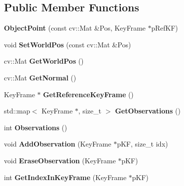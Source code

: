 \subsection*{Public Member Functions}
\begin{DoxyCompactItemize}
\item 
\mbox{\label{classObjectPoint_abe20569ffec71bce3c7798dd20098eff}} 
{\bfseries Object\+Point} (const cv\+::\+Mat \&Pos, Key\+Frame $\ast$p\+Ref\+KF)
\item 
\mbox{\label{classObjectPoint_a9202ad0239743be43bbae9af182fed56}} 
void {\bfseries Set\+World\+Pos} (const cv\+::\+Mat \&Pos)
\item 
\mbox{\label{classObjectPoint_ae872c8a2e3ca4b541252e13555f625fb}} 
cv\+::\+Mat {\bfseries Get\+World\+Pos} ()
\item 
\mbox{\label{classObjectPoint_ad543762a92802bf9fb601d208e4c007c}} 
cv\+::\+Mat {\bfseries Get\+Normal} ()
\item 
\mbox{\label{classObjectPoint_ac205d86215aa26315881f4db4ef695b5}} 
Key\+Frame $\ast$ {\bfseries Get\+Reference\+Key\+Frame} ()
\item 
\mbox{\label{classObjectPoint_a38d19937c25237ba87eb32e8fd2d935b}} 
std\+::map$<$ Key\+Frame $\ast$, size\+\_\+t $>$ {\bfseries Get\+Observations} ()
\item 
\mbox{\label{classObjectPoint_ae7d2d3ae8c19070f2bcf41f5507ca194}} 
int {\bfseries Observations} ()
\item 
\mbox{\label{classObjectPoint_ade4a1f546a7dc3d0a17fd7f73b5252e5}} 
void {\bfseries Add\+Observation} (Key\+Frame $\ast$p\+KF, size\+\_\+t idx)
\item 
\mbox{\label{classObjectPoint_a59da3ff3ffccde349304b779f3457254}} 
void {\bfseries Erase\+Observation} (Key\+Frame $\ast$p\+KF)
\item 
\mbox{\label{classObjectPoint_a6952d1e522571ebc982708b931006ac1}} 
int {\bfseries Get\+Index\+In\+Key\+Frame} (Key\+Frame $\ast$p\+KF)

\end{DoxyCompactItemize}
